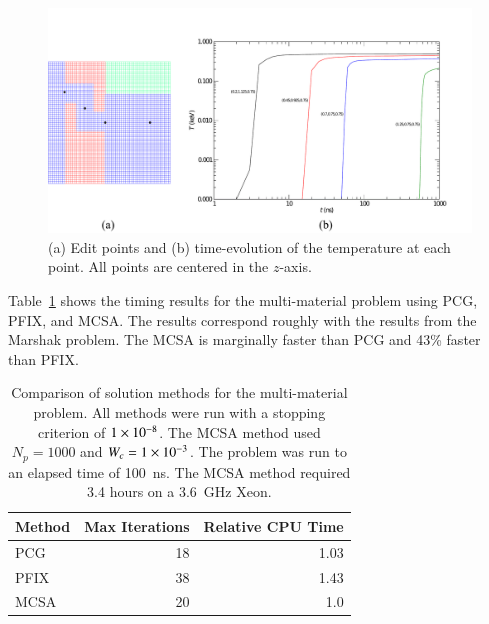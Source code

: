 \documentclass[preprint,12pt]{elsarticle}
\begin{document}
\begin{figure}[ht!]
  \begin{center}
    \includegraphics[width=5in,clip]{edit_points.pdf}
  \end{center}
  \caption{(a) Edit points and (b) time-evolution of the temperature at each
    point.  All points are centered in the $z$-axis.}
  \label{fig:edit-points}
\end{figure}

Table~\ref{tab:multimat_comparison} shows the timing results for the
multi-material problem using PCG, PFIX, and MCSA.  The results correspond
roughly with the results from the Marshak problem.  The MCSA is marginally
faster than PCG and 43\% faster than PFIX.
\begin{table}[htbp!]
  \caption{ Comparison of solution methods for the multi-material
    problem. All methods were run with a stopping criterion of
    $1\times 10^{-8}$.  The MCSA method used $N_p=1000$ and $W_c =
    1\times 10^{-3}$.  The problem was run to an elapsed time of 100~ns.
    The MCSA method required 3.4 hours on a 3.6~GHz Xeon.}
  \label{tab:multimat_comparison}
  \begin{center}
    \begin{tabular}{lrr}\hline\hline
      \multicolumn{1}{c}{Method} & \multicolumn{1}{c}{Max Iterations}
      & \multicolumn{1}{c}{Relative CPU Time}\\\hline\hline  PCG &
      18 & 1.03 \\  PFIX & 38 & 1.43 \\  MCSA & 20 & 1.0
      \\ \hline\hline
    \end{tabular}
  \end{center}
\end{table}

\end{document}
